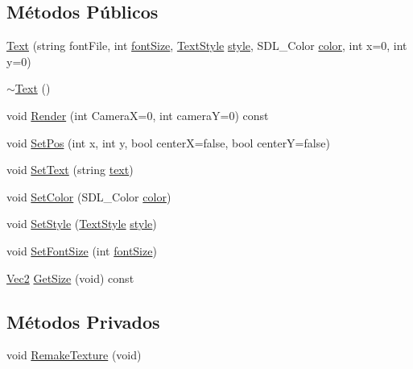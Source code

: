 \subsection*{Métodos Públicos}
\begin{DoxyCompactItemize}
\item 
\hyperlink{classText_ab9d958002beef60e08b0e932267401d0}{Text} (string font\+File, int \hyperlink{classText_af1b0c4c5d94f1a5338398f37e7b9ebbe}{font\+Size}, \hyperlink{Text_8h_ad5957a553b7d89d4921c39cc3ad6bc45}{Text\+Style} \hyperlink{classText_aaf6b429b30c8e7b380aa2433cf1296ea}{style}, S\+D\+L\+\_\+\+Color \hyperlink{classText_ab0f771bd18d8e968f7aaee4a4e26e385}{color}, int x=0, int y=0)
\item 
\hyperlink{classText_a2d49e5c280e205125b149f7777ae30c7}{$\sim$\+Text} ()
\item 
void \hyperlink{classText_af32d96322e20f25f1a4ee99369d08a95}{Render} (int Camera\+X=0, int camera\+Y=0) const 
\item 
void \hyperlink{classText_a8c1865b3d0971b3611ae82e9ad85acb1}{Set\+Pos} (int x, int y, bool center\+X=false, bool center\+Y=false)
\item 
void \hyperlink{classText_abffaafcd871424690014ca0a74c45989}{Set\+Text} (string \hyperlink{classText_a7da8331e2da684bb0485a3ee7893b415}{text})
\item 
void \hyperlink{classText_a16b351605f583b6ece8c93fc8c4df279}{Set\+Color} (S\+D\+L\+\_\+\+Color \hyperlink{classText_ab0f771bd18d8e968f7aaee4a4e26e385}{color})
\item 
void \hyperlink{classText_acd7cd539df681365587e86144cc3c352}{Set\+Style} (\hyperlink{Text_8h_ad5957a553b7d89d4921c39cc3ad6bc45}{Text\+Style} \hyperlink{classText_aaf6b429b30c8e7b380aa2433cf1296ea}{style})
\item 
void \hyperlink{classText_a0d37b9c067e62e10ebd1f0f74dbb5e66}{Set\+Font\+Size} (int \hyperlink{classText_af1b0c4c5d94f1a5338398f37e7b9ebbe}{font\+Size})
\item 
\hyperlink{classVec2}{Vec2} \hyperlink{classText_aa2a449375e15e6abb2911fff0af26c66}{Get\+Size} (void) const 
\end{DoxyCompactItemize}
\subsection*{Métodos Privados}
\begin{DoxyCompactItemize}
\item 
void \hyperlink{classText_a5c794eef4ba7e0bd09a3039835f30e48}{Remake\+Texture} (void)
\end{DoxyCompactItemize}

